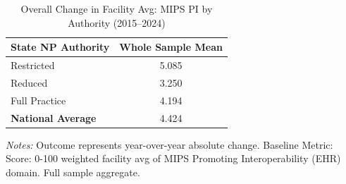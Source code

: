 \begin{table}[htbp]
    \centering
    \caption{Overall Change in Facility Avg: MIPS PI by Authority (2015--2024)}
    \label{tab:d_fac_mips_pi_score_full}
    \vspace{0.2cm}
    \begin{tabular}{lc}
        \toprule
        \textbf{State NP Authority} & \textbf{Whole Sample Mean} \\
        \midrule
        Restricted & 5.085 \\
        Reduced & 3.250 \\
        Full Practice & 4.194 \\
        \midrule
        \textbf{National Average} & 4.424 \\
        \bottomrule
    \end{tabular}
    \vspace{0.1cm}
    \begin{minipage}{0.6\textwidth}
        \footnotesize \textit{Notes:} Outcome represents year-over-year absolute change. Baseline Metric: Score: 0-100 weighted facility avg of MIPS Promoting Interoperability (EHR) domain. Full sample aggregate.
    \end{minipage}
\end{table}